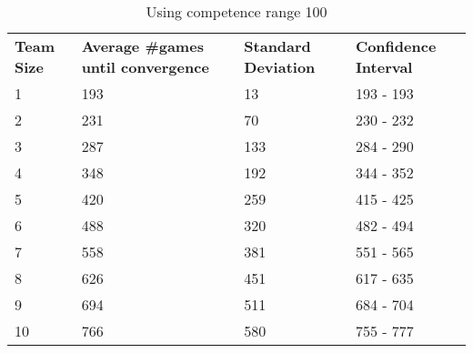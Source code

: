 \documentclass[12pt]{article}
\begin{document}
\begin{table}[!htb]
	\centering
	\caption{Using competence range 100}
	\begin{tabular}{llll}
		\textbf{Team Size} & \textbf{Average \#games until convergence} & \textbf{Standard Deviation} & \textbf{Confidence Interval} \\
		1                  & 193              & 13                          & 193 - 193                    \\
		2                  & 231              & 70                          & 230 - 232                    \\
		3                  & 287              & 133                         & 284 - 290                    \\
		4                  & 348              & 192                         & 344 - 352                    \\
		5                  & 420              & 259                         & 415 - 425                    \\
		6                  & 488              & 320                         & 482 - 494                    \\
		7                  & 558              & 381                         & 551 - 565                    \\
		8                  & 626              & 451                         & 617 - 635                    \\
		9                  & 694              & 511                         & 684 - 704                    \\
		10                 & 766              & 580                         & 755 - 777                   
	\end{tabular}
\end{table}
\end{document}
